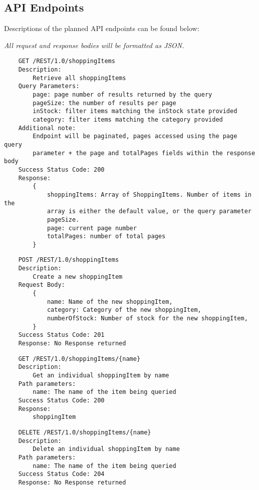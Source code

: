 \subsection{API Endpoints}
Descriptions of the planned API endpoints can be found below: 

\emph{All request and response bodies will be formatted as JSON.}

\begin{verbatim}
    GET /REST/1.0/shoppingItems
    Description:
        Retrieve all shoppingItems
    Query Parameters:
        page: page number of results returned by the query
        pageSize: the number of results per page
        inStock: filter items matching the inStock state provided
        category: filter items matching the category provided
    Additional note:
        Endpoint will be paginated, pages accessed using the page query 
        parameter + the page and totalPages fields within the response body
    Success Status Code: 200
    Response: 
        {
            shoppingItems: Array of ShoppingItems. Number of items in the
            array is either the default value, or the query parameter
            pageSize.
            page: current page number
            totalPages: number of total pages
        }
\end{verbatim}\medskip

\begin{verbatim}
    POST /REST/1.0/shoppingItems
    Description:
        Create a new shoppingItem
    Request Body:
        {
            name: Name of the new shoppingItem,
            category: Category of the new shoppingItem,
            numberOfStock: Number of stock for the new shoppingItem,
        }
    Success Status Code: 201
    Response: No Response returned
\end{verbatim}\medskip

\begin{verbatim}
    GET /REST/1.0/shoppingItems/{name}
    Description:
        Get an individual shoppingItem by name
    Path parameters:
        name: The name of the item being queried
    Success Status Code: 200
    Response:
        shoppingItem
\end{verbatim}\medskip

\begin{verbatim}
    DELETE /REST/1.0/shoppingItems/{name}
    Description:
        Delete an individual shoppingItem by name
    Path parameters:
        name: The name of the item being queried
    Success Status Code: 204
    Response: No Response returned
\end{verbatim}\medskip

